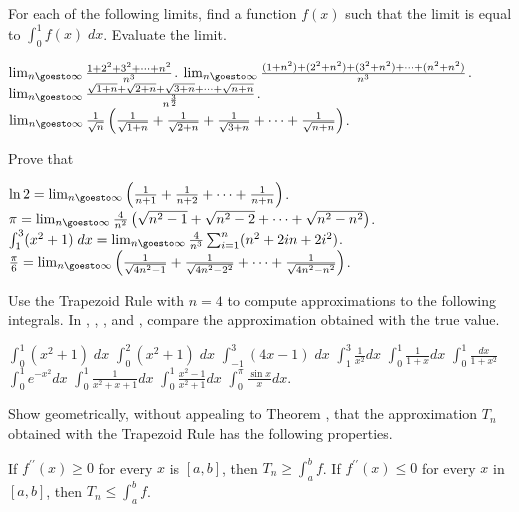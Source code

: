 \begin{exercises}

For each of the following limits, find a function $f(x)$
such that the limit is equal to $\int_0^1 f(x) \; dx$.
Evaluate the limit.
\begin{exenum}
\x
$\lim_{n\goesto\infty}
\frac{1+2^2+3^2+\cdots+n^2}{n^3}$.
\x
$\lim_{n\goesto\infty}
\frac{(1+n^2)+(2^2+n^2)+(3^2+n^2)+\cdots+(n^2+n^2)}
{n^3}$.
\x
$\lim_{n\goesto\infty}
\frac{\sqrt{1+n}+\sqrt{2+n}+\sqrt{3+n}+\cdots+\sqrt{n+n}}
{n^{\frac32}}$.
\x
$\lim_{n\goesto\infty}
\frac1{\sqrt n}
\left(\frac1{\sqrt{1+n}}+\frac1{\sqrt{2+n}}+
\frac1{\sqrt{3+n}}+\cdots+\frac1{\sqrt{n+n}}
\right)$.
\end{exenum}

Prove that
\begin{exenum}
\x
$\ln 2 = \lim_{n\goesto\infty}
\left( \frac1{n+1}+\frac1{n+2}+\cdots+\frac1{n+n}
\right)$.
\x
$\pi = \lim_{n\goesto\infty} \frac4{n^2}
\left(\sqrt{n^2-1}+\sqrt{n^2-2}+\cdots+\sqrt{n^2-n^2}
\right)$.
\x
$\int_1^3(x^2+1)\;dx=
\lim_{n\goesto\infty} \frac4{n^3}
\sum_{i=1}^n(n^2+2in+2i^2)$.
\x
$\frac{\pi}6 = \lim_{n\goesto\infty}
\left(\frac{1}{\sqrt{4n^2-1}}+\frac{1}{\sqrt{4n^2-2^2}}+
\cdots+\frac{1}{\sqrt{4n^2-n^2}}\right)$.
\end{exenum}

Use the Trapezoid Rule with $n=4$
to compute approximations to the following
integrals.
In , , ,
and , compare the approximation
obtained with the true value.
\begin{exenum}
\x
{}
$\int_0^1 (x^2+1) \; dx$
\x
{}
$\int_0^2 (x^2+1) \; dx$
\x
{}
$\int_{-1}^3 (4x-1) \; dx$
\x
{}
$\int_1^3 \frac1{x^2} dx$
\x
$\int_0^1 \frac1{1+x} dx$
\x
$\int_0^1 \frac{dx}{1+x^2}$
\x
$\int_0^1 e^{-x^2} dx$
\x
$\int_0^1 \frac1{x^2+x+1} dx$
\x
$\int_0^1 \frac{x^2-1}{x^2+1} dx$
\x
$\int_0^{\pi} \frac{\sin x}{x} dx$.
\end{exenum}

Show geometrically, without appealing to
Theorem , that the approximation
$T_n$ obtained with the Trapezoid Rule
has the following properties.
\begin{exenum}
\x
If $f^{\prime\prime}(x) \geq 0$
for every $x$ is $[a,b]$, then
$T_n \geq \int_a^b f$.
\x
If $f^{\prime\prime}(x) \leq 0$
for every $x$ in $[a,b]$, then
$T_n \leq \int_a^b f$.
\end{exenum}


\end{exercises}
